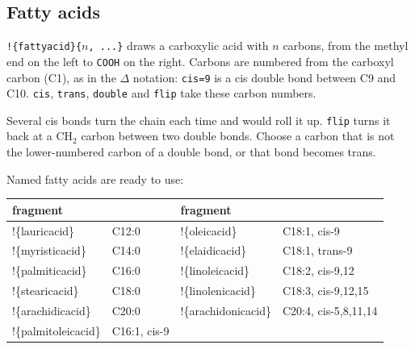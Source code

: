 \documentclass[11pt]{article}
\newcommand\key[1]{\texttt{\color{cfcode}#1}}
\newcommand\frag[1]{\texttt{!\{#1\}}}
\begin{document}
\subsection{Fatty acids}
\frag{fattyacid}\verb|{|$n$\verb|, ...}| draws a carboxylic acid with $n$
carbons, from the methyl end on the left to \texttt{COOH} on the right.
Carbons are numbered from the carboxyl carbon (C1), as in the
$\Delta$ notation: \verb|cis=9| is a cis double bond between C9 and C10.
\key{cis}, \key{trans}, \key{double} and \key{flip} take these carbon
numbers.
\begin{examplewide}
\par\medskip
{}
\end{examplewide}
Several cis bonds turn the chain each time and would roll it up.
\key{flip} turns it back at a CH$_2$ carbon between two double bonds. Choose
a carbon that is not the lower-numbered carbon of a double bond, or that bond
becomes trans.
\begin{examplewide}
\qquad
{}
\end{examplewide}

Named fatty acids are ready to use:

\medskip
\begin{center}\small
\begin{tabular}{>{\ttfamily}l l >{\ttfamily}l l}
\toprule
\normalfont fragment & & \normalfont fragment & \\\midrule
!\{lauricacid\}     & C12:0 & !\{oleicacid\}       & C18:1, cis-9\\
!\{myristicacid\}   & C14:0 & !\{elaidicacid\}     & C18:1, trans-9\\
!\{palmiticacid\}   & C16:0 & !\{linoleicacid\}    & C18:2, cis-9,12\\
!\{stearicacid\}    & C18:0 & !\{linolenicacid\}   & C18:3, cis-9,12,15\\
!\{arachidicacid\}  & C20:0 & !\{arachidonicacid\} & C20:4, cis-5,8,11,14\\
!\{palmitoleicacid\}& C16:1, cis-9 & & \\
\bottomrule
\end{tabular}
\end{center}
\begin{examplewide}
\qquad
{}
\end{examplewide}

\end{document}
